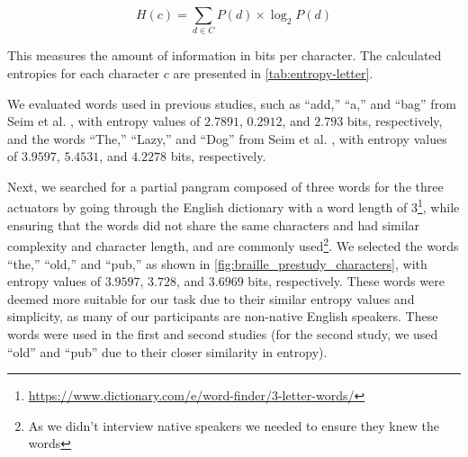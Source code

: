 \[
H(c) = \sum_{d \in C} P(d) \times \log_2 P(d)
\]

This measures the amount of information in bits per character. The calculated entropies for each character \( c \) are presented in \autoref{tab:entropy-letter}.

\begin{table}
    \centering
    \caption{Entropy for each Braille letter rounded to $4$ decimal places.}
    \label{tab:entropy-letter}
\end{table}

We evaluated words used in previous studies, such as ``add,'' ``a,'' and ``bag'' from Seim et al. \cite{Seim2014a, Seim2014}, with entropy values of \( 2.7891 \), \( 0.2912 \), and \( 2.793 \) bits, respectively, and the words ``The,'' ``Lazy,'' and ``Dog''  from Seim et al. \cite{Seim2018}, with entropy values of \( 3.9597 \), \( 5.4531 \), and \( 4.2278 \) bits, respectively.

Next, we searched for a partial pangram composed of three words for the three actuators by going through the English dictionary with a word length of  3\footnote{\url{https://www.dictionary.com/e/word-finder/3-letter-words/}}, while ensuring that the words did not share the same characters and had similar complexity and character length, and are commonly used\footnote{As we didn't interview native speakers we needed to ensure they knew the words}. 
We selected the words ``the,'' ``old,'' and ``pub,'' as shown in \autoref{fig:braille_prestudy_characters}, with entropy values of \( 3.9597 \), \( 3.728 \), and \( 3.6969 \) bits, respectively. These words were deemed more suitable for our task due to their similar entropy values and simplicity, as many of our participants are non-native English speakers. These words were used in the first and second studies (for the second study, we used ``old'' and ``pub'' due to their closer similarity in entropy).

